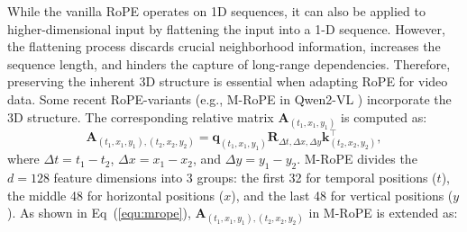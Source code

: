 While the vanilla RoPE operates on 1D sequences, it can also be applied to higher-dimensional input by flattening the input into a 1-D sequence.
However, the flattening process discards crucial neighborhood information, increases the sequence length, and hinders the capture of long-range dependencies.
Therefore, preserving the inherent 3D structure is essential when adapting RoPE for video data.
Some recent RoPE-variants (e.g., M-RoPE in Qwen2-VL \cite{wang2024qwen2}) incorporate the $3$D structure.
The corresponding relative matrix $\bm{A}_{(t_1,x_1,y_1)}$ is computed as:
\begin{equation}
\bm{A}_{(t_1,x_1,y_1),(t_2,x_2,y_2)}=\bm{q}_{(t_1,x_1,y_1)}\bm{R}_{\Delta t,\Delta x,\Delta y}\bm{k}_{(t_2,x_2,y_2)}^\top,
\end{equation}
where $\Delta t=t_1-t_2$, $\Delta x=x_1-x_2$, and $\Delta y=y_1-y_2$.
M-RoPE divides the $d=128$ feature dimensions into 3 groups: the first 32 for temporal positions ($t$), the middle 48 for horizontal positions ($x$), and the last 48 for vertical positions ($y$). As shown in Eq~(\ref{equ:mrope}), $\bm{A}_{(t_1,x_1,y_1),(t_2,x_2,y_2)}$ in M-RoPE is extended as:

